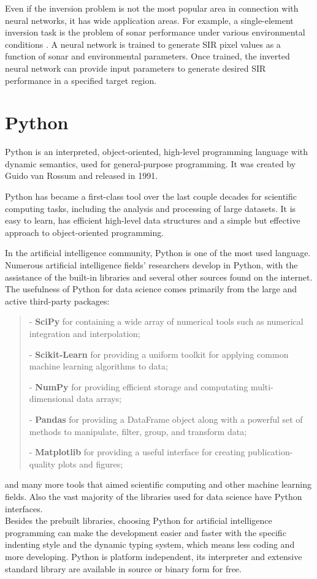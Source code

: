 Even if the inversion problem is not the most popular area in connection with neural networks, it has wide application areas. For example, a single-element inversion task is the problem of sonar performance under various environmental conditions \cite{article}. A neural network is trained to generate SIR pixel values as a function of sonar and environmental parameters. Once trained, the inverted neural network can provide input parameters to generate desired SIR performance in a specified target region. 



\section{Python}

Python is an interpreted, object-oriented, high-level programming language with dynamic semantics, used for general-purpose programming. It was created by Guido van Rossum and released in 1991. \medskip

Python has became a first-class tool over the last couple decades for scientific computing tasks, including the analysis and processing of large datasets. It is easy to learn, has efficient high-level data structures and a simple but effective approach to object-oriented programming.\medskip

In the artificial intelligence community, Python is one of the most used language. Numerous artificial intelligence fields' researchers develop in Python, with the assistance of the built-in libraries and several other sources found on the internet. The usefulness of Python for data science comes primarily from the large and active third-party packages: 
\begin{verse}
	- \textbf{SciPy} for containing a wide array of numerical tools such as numerical integration and interpolation;
	
	- \textbf{Scikit-Learn} for providing a uniform toolkit for applying common machine learning algorithms to data;
	
	- \textbf{NumPy} for providing efficient storage and computating multi-dimensional data arrays;
	
	-  \textbf{Pandas} for providing a DataFrame object along with a powerful set of methods to manipulate, filter, group, and transform data; 
	
	- \textbf{Matplotlib} for providing a useful interface for creating publication-quality plots and figures;
\end{verse} 
and many more tools that aimed scientific computing and other machine learning fields. Also the vast majority of the libraries used for data science have Python interfaces.\\ 
Besides the prebuilt libraries, choosing Python for artificial intelligence programming can make the development easier and faster with the specific indenting style and the dynamic typing system, which means less coding and more developing. Python is platform independent, its interpreter and extensive standard library are available in source or binary form for free.